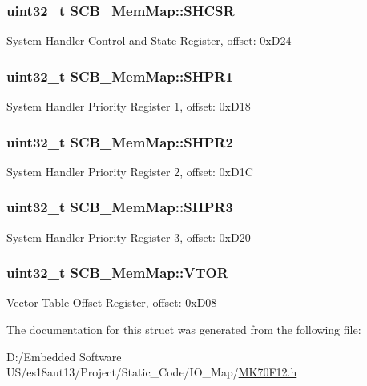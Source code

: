 \subsubsection[{S\+H\+C\+S\+R}]{\setlength{\rightskip}{0pt plus 5cm}uint32\+\_\+t S\+C\+B\+\_\+\+Mem\+Map\+::\+S\+H\+C\+S\+R}\label{struct_s_c_b___mem_map_ae2b73d4b9744b878527466ec57dbfdb7}
System Handler Control and State Register, offset\+: 0x\+D24 \hypertarget{struct_s_c_b___mem_map_afe02d5ca0102ec35b79172d453854ed0}{}
\subsubsection[{S\+H\+P\+R1}]{\setlength{\rightskip}{0pt plus 5cm}uint32\+\_\+t S\+C\+B\+\_\+\+Mem\+Map\+::\+S\+H\+P\+R1}\label{struct_s_c_b___mem_map_afe02d5ca0102ec35b79172d453854ed0}
System Handler Priority Register 1, offset\+: 0x\+D18 \hypertarget{struct_s_c_b___mem_map_a1636322022eb10e4acedf40018708b68}{}
\subsubsection[{S\+H\+P\+R2}]{\setlength{\rightskip}{0pt plus 5cm}uint32\+\_\+t S\+C\+B\+\_\+\+Mem\+Map\+::\+S\+H\+P\+R2}\label{struct_s_c_b___mem_map_a1636322022eb10e4acedf40018708b68}
System Handler Priority Register 2, offset\+: 0x\+D1\+C \hypertarget{struct_s_c_b___mem_map_a8ac3a3b8dd23fb279640b98a95fb796a}{}
\subsubsection[{S\+H\+P\+R3}]{\setlength{\rightskip}{0pt plus 5cm}uint32\+\_\+t S\+C\+B\+\_\+\+Mem\+Map\+::\+S\+H\+P\+R3}\label{struct_s_c_b___mem_map_a8ac3a3b8dd23fb279640b98a95fb796a}
System Handler Priority Register 3, offset\+: 0x\+D20 \hypertarget{struct_s_c_b___mem_map_aa327db1d9948595498fba43acc8d336b}{}
\subsubsection[{V\+T\+O\+R}]{\setlength{\rightskip}{0pt plus 5cm}uint32\+\_\+t S\+C\+B\+\_\+\+Mem\+Map\+::\+V\+T\+O\+R}\label{struct_s_c_b___mem_map_aa327db1d9948595498fba43acc8d336b}
Vector Table Offset Register, offset\+: 0x\+D08 

The documentation for this struct was generated from the following file\+:\begin{DoxyCompactItemize}
\item 
D\+:/\+Embedded Software U\+S/es18aut13/\+Project/\+Static\+\_\+\+Code/\+I\+O\+\_\+\+Map/\hyperlink{_m_k70_f12_8h}{M\+K70\+F12.\+h}\end{DoxyCompactItemize}
